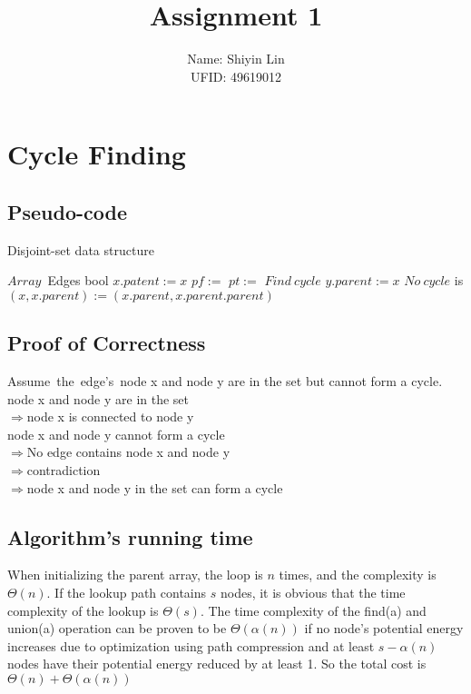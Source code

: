 \documentclass{article}
\title{Assignment 1}
\author{Name: Shiyin Lin \\UFID: 49619012}
\date{}
\begin{document}
\maketitle

\section{Cycle Finding}
\subsection{Pseudo-code}
\begin{algorithm}
    \caption{Disjoint-set data structure}
    \begin{algorithmic}[1] 
        \Require $Array$\ Edges  
        \Ensure bool
                \State $x.patent := x$
            \EndIf
                \State $pf := $
                \State $pt := $
                    \State $Find\ cycle$
                    \State {}
                \EndIf
                \State $y.parent := x$
            \EndFor
            \State $No\ cycle$
            \State {}
        \EndFunction
        \State  
         is 
                \State $(x, x.parent) := (x.parent, x.parent.parent)$  
            \EndWhile  
            \State {}  
        \EndFunction
    \end{algorithmic}  
\end{algorithm} 
\subsection{Proof of Correctness}
Assume\ the\ edge's\ node x and node y are in the set but cannot form a cycle.\\
node x and node y are in the set\\
$\Rightarrow$node x is connected to node y\\
node x and node y cannot form a cycle\\
$\Rightarrow$No edge contains node x and node y\\
$\Rightarrow$contradiction\\
$\Rightarrow$node x and node y in the set can form a cycle

\subsection{Algorithm's running time}
When initializing the parent array, the loop is $n$ times, and the complexity is $\Theta(n)$. If the lookup path contains $s$ nodes, it is obvious that the time complexity of the lookup is $\Theta(s)$. The time complexity of the find(a) and union(a) operation can be proven to be $\Theta(\alpha(n))$ if no node's potential energy increases due to optimization using path compression and at least $s-\alpha(n)$ nodes have their potential energy reduced by at least 1. So the total cost is $\Theta(n)+\Theta(\alpha(n))$
\end{document}

